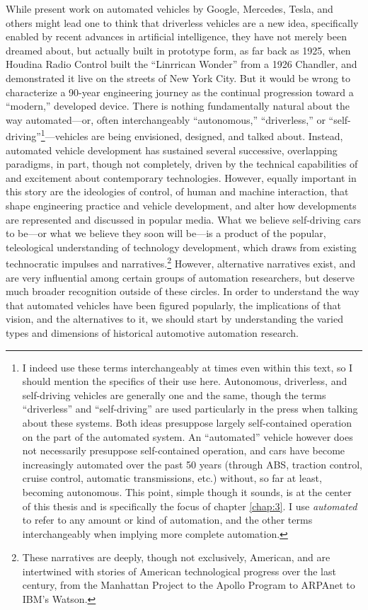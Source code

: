 While present work on automated vehicles by Google, Mercedes, Tesla,
and others might lead one to think that driverless vehicles are a
new idea, specifically enabled by recent advances in artificial
intelligence, they have not merely been dreamed about, but actually
built in prototype form, as far back as 1925, when Houdina Radio Control
built the ``Linrrican Wonder'' from a 1926 Chandler, and demonstrated
it live on the streets of New York City. But it would be wrong to
characterize a 90-year engineering journey as the continual
progression toward a ``modern,'' developed device. There is nothing
fundamentally natural about the way automated---or, often interchangeably
``autonomous,'' ``driverless,'' or ``self-driving''\footnote{I indeed use these terms
  interchangeably at times even within this text, so I should mention
the specifics of their use here. Autonomous, driverless, and self-driving
vehicles are generally one and the same, though the terms
``driverless'' and
``self-driving'' are used particularly in the press when talking about
these systems. Both ideas presuppose largely self-contained operation
on the part of the automated system. An ``automated'' vehicle however
does not necessarily presuppose self-contained operation, and cars
have become increasingly automated over the past 50 years (through
ABS, traction control, cruise control, automatic transmissions, etc.) without, so
far at least, becoming autonomous. This point, simple though it
sounds, is at the center of this thesis and is specifically the focus
of chapter \ref{chap:3}. I use \emph{automated} to refer to any amount
or kind of automation, and the other terms interchangeably when
implying more complete automation.}---vehicles are being
envisioned, designed, and talked about. Instead, automated vehicle
development has sustained several successive, overlapping paradigms,
in part, though not completely, driven by the technical capabilities
of and excitement about contemporary technologies. However, equally
important in this story are the ideologies of control, of human and
machine interaction, that shape engineering practice and vehicle
development, and alter how developments are represented and discussed
in popular media. What we believe self-driving cars to be---or what we
believe they soon will be---is a product of the popular, teleological understanding
of technology development, which draws from existing technocratic
impulses and narratives.\footnote{These narratives are deeply, though
  not exclusively, American, and are intertwined with stories of
  American technological progress over the last century, from the
  Manhattan Project to the Apollo Program to ARPAnet to IBM's
  Watson.} However, alternative narratives exist, and 
are very influential among certain groups of automation researchers,
but deserve much broader recognition outside of these circles. In
order to understand the way that automated vehicles have been figured
popularly, the implications of that vision, and the alternatives to
it, we should start by understanding the varied types and dimensions
of historical automotive automation research.


